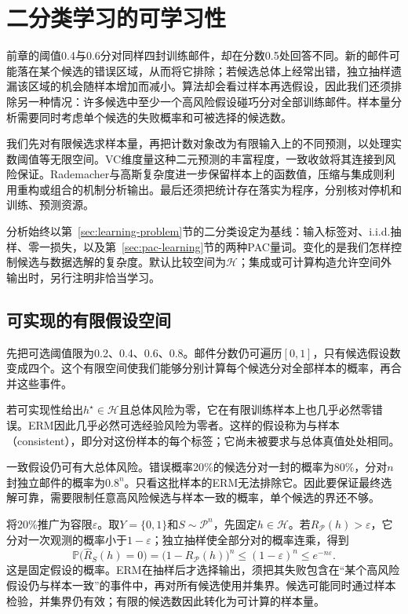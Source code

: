 \chapter{二分类学习的可学习性}
\label{chap:binary-learnability}

前章的阈值0.4与0.6分对同样四封训练邮件，却在分数0.5处回答不同。新的邮件可能落在某个候选的错误区域，从而将它排除；若候选总体上经常出错，独立抽样遗漏该区域的机会随样本增加而减小。算法却会看过样本再选假设，因此我们还须排除另一种情况：许多候选中至少一个高风险假设碰巧分对全部训练邮件。样本量分析需要同时考虑单个候选的失败概率和可被选择的候选数。

我们先对有限候选求样本量，再把计数对象改为有限输入上的不同预测，以处理实数阈值等无限空间。VC维度量这种二元预测的丰富程度，一致收敛将其连接到风险保证。Rademacher与高斯复杂度进一步保留样本上的函数值，压缩与集成则利用重构或组合的机制分析输出。最后还须把统计存在落实为程序，分别核对停机和训练、预测资源。

分析始终以第~\ref{sec:learning-problem}节的二分类设定为基线：输入标签对、i.i.d.抽样、零一损失，以及第~\ref{sec:pac-learning}节的两种PAC量词。变化的是我们怎样控制候选与数据选解的复杂度。默认比较空间为$\mathcal H$；集成或可计算构造允许空间外输出时，另行注明非恰当学习。

\section{可实现的有限假设空间}
\label{sec:binary-finite-class}

先把可选阈值限为0.2、0.4、0.6、0.8。邮件分数仍可遍历$[0,1]$，只有候选假设数变成四个。这个有限空间使我们能够分别计算每个候选分对全部样本的概率，再合并这些事件。

若可实现性给出$h^\star\in\mathcal H$且总体风险为零，它在有限训练样本上也几乎必然零错误。ERM因此几乎必然可选经验风险为零者。这样的假设称为与样本（consistent），即分对这份样本的每个标签；它尚未被要求与总体真值处处相同。

一致假设仍可有大总体风险。错误概率20\%的候选分对一封的概率为80\%，分对$n$封独立邮件的概率为$0.8^n$。只看这批样本的ERM无法排除它。因此要保证最终选解可靠，需要限制任意高风险候选与样本一致的概率，单个候选的界还不够。

将20\%推广为容限$\varepsilon$。取$Y=\{0,1\}$和$S\sim\mathcal P^n$，先固定$h\in\mathcal H$。若$R_{\mathcal P}(h)>\varepsilon$，它分对一次观测的概率小于$1-\varepsilon$；独立抽样使全部分对的概率连乘，得到
\begin{equation}
  \mathbb P\bigl(\hat R_S(h)=0\bigr)
  =\bigl(1-R_{\mathcal P}(h)\bigr)^n
  \leq(1-\varepsilon)^n\leq e^{-n\varepsilon}.
  \label{eq:bad-consistent-hypothesis}
\end{equation}
这是固定假设的概率。ERM在抽样后才选择输出，须把其失败包含在“某个高风险假设仍与样本一致”的事件中，再对所有候选使用并集界。候选可能同时通过样本检验，并集界仍有效；有限的候选数因此转化为可计算的样本量。

